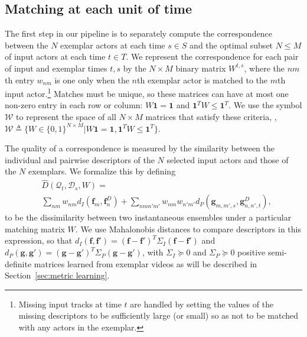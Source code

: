 \subsection{Matching at each unit of time}
The first step in our pipeline is to separately compute the correspondence between the $N$ exemplar actors at each time $s\in S$ and the optimal subset $N\le M$ of input actors at each time $t\in T$. We represent the correspondence for each pair of input and exemplar times $t,s$ by the $N\times M$ binary matrix $W^{t,s}$, where the $nm$th entry $w_{nm}$ is one only when the $n$th exemplar actor is matched to the $m$th input actor.\footnote{Missing input tracks at time $t$ are handled by setting the values of the missing descriptors to be sufficiently large (or small) so as not to be matched with any actors in the exemplar.} Matches must be unique, so these matrices can have at most one non-zero entry in each row or column: $W\mathbf{1}=\mathbf{1}$ and $\mathbf{1}^{T}W\leq\mathbf{1}^{T}$. We use the symbol $\mathcal{W}$ to represent the space of all $N\times M$ matrices that satisfy these criteria, \ie, $\mathcal{W}\triangleq\{W\in\{0,1\}^{N\times M}| W\mathbf{1}=\mathbf{1}, \mathbf{1}^{T}W\leq\mathbf{1}^{T}\}$.

The quality of a correspondence is measured by the similarity between the individual and pairwise descriptors of the $N$ selected input actors and those of the $N$ exemplars. We formalize this by defining 
\begin{equation*}
\begin{split}
&\hat{D}(\mathcal{Q}_{t}, \mathcal{D}_{s}, W)=\\
&\sum_{nm}w_{nm}d_{I}(\mathbf{f}_{m}, \mathbf{f}^{D}_{n})+\!\!\!\!\!\!\sum_{nmn'm'}\!\!\!\!\!w_{nm}w_{n'm'}d_{P}(\mathbf{g}_{m,m',s}, \mathbf{g}^{D}_{n,n',t}),
\end{split}
\end{equation*}
to be the dissimilarity between two instantaneous ensembles under a particular matching matrix $W$. We use  Mahalonobis distances to compare descriptors in this expression, so that $d_{I}(\mathbf{f}, \mathbf{f}')=(\mathbf{f}-\mathbf{f}')^{T}\Sigma_{I}(\mathbf{f}-\mathbf{f}')$ and $d_{P}(\mathbf{g}, \mathbf{g}')=(\mathbf{g}-\mathbf{g}')^{T}\Sigma_{P}(\mathbf{g}-\mathbf{g}')$, with $\Sigma_{I}\succeq 0$ and $\Sigma_{P}\succeq 0$ positive semi-definite matrices learned from exemplar videos as will be described in Section~\ref{sec:metric learning}.

